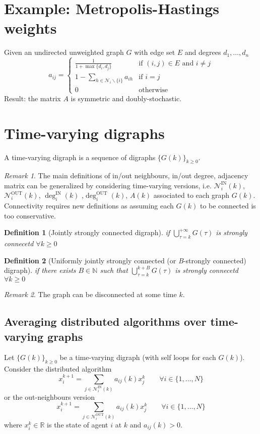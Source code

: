 \documentclass{book}
\newcommand{\R}{\mathbb{R}}
\newcommand{\N}{\mathbb{N}}
\theoremstyle{theoremv2}
\theoremstyle{defv2}
\newtheorem{definition}{Definition}[chapter]
\theoremstyle{remark}
\newtheorem*{remark}{Remark}
\theoremstyle{remark}
\theoremstyle{definition}
\theoremstyle{definition}
\begin{document}
\section{Example: Metropolis-Hastings weights}
Given an undirected unweighted graph $G$ with edge set $E$ and degrees $d_1,\dots,d_n$
\[
    a_{ij} = \begin{cases}
        \displaystyle\frac{1}{1+\max\{d_i,d_j\}} & \text{if } (i,j)\in E \text{ and } i\neq j\\
        1- \displaystyle\sum_{h\in\mathcal{N}_i \backslash \{i\}}^{} a_{ih} & \text{if } i=j\\ 
        0 & \text{otherwise}
    \end{cases}
\]
Result: the matrix $A$ is symmetric and doubly-stochastic.

\section{Time-varying digraphs}
A time-varying digraph is a sequence of digraphs $\{G(k)\}_{k\geq 0}$.
\begin{remark}
    The main definitions of in/out neighbours, in/out degree, adjacency matrix can be generalized by considering time-varying versions, i.e. $\mathcal{N}_i^{\text{IN}}(k)$, $\mathcal{N}_i^{\text{OUT}}(k)$, $\deg_i^{\text{IN}}(k)$ ,$\deg_i^{\text{OUT}}(k)$, $A(k)$ associated to each graph $G(k)$. Connectivity requires new definitions as assuming each $G(k)$ to be connected is too conservative.
\end{remark}
\begin{definition}[Jointly strongly connected digraph]
    if $\bigcup_{\tau=k}^{+\infty}G(\tau)$ is strongly connecetd $\forall k \geq 0$
\end{definition}

\begin{definition}[Uniformly jointly strongly connected (or \emph{B}-strongly connected) digraph]
    if there exists $B\in\N$ such that $\bigcup_{\tau=k}^{k+B}G(\tau)$ is strongly connecetd $\forall k \geq 0$
\end{definition}

\begin{remark}
    The graph can be disconnected at some time $k$.
\end{remark}

\subsection{Averaging distributed algorithms over time-varying graphs}
Let $\{G(k)\}_{k\geq 0}$ be a time-varying digraph (with self loops for each $G(k)$). Consider the distributed algorithm 
\[
    x_i^{k+1} = \displaystyle\sum_{j\in\mathcal{N}_i^\text{IN}(k)}a_{ij}(k)x_j^k \qquad \forall i \in\{1,\dots,N\} 
\]
or the out-neighbours version 
\[
    x_i^{k+1} = \displaystyle\sum_{j\in\mathcal{N}_i^\text{OUT}(k)}a_{ij}(k)x_j^k \qquad \forall i \in\{1,\dots,N\} 
\]
where $x_i^k\in\R$ is the state of agent $i$ at $k$ and $a_{ij}(k)>0$. 
\end{document}
